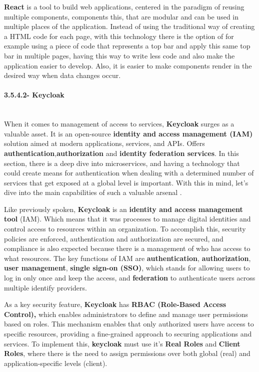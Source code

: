 \textbf{React} is a tool to build web applications, centered in the paradigm of reusing multiple components, components this, that are modular and can be used in multiple places of the application. Instead of using the traditional way of creating a HTML code for each page, with this technology there is the option of for example using a piece of code that represents a top bar and apply this same top bar in multiple pages, having this way to write less code and also make the application easier to develop. Also, it is easier to make components render in the desired way when data changes occur. 

\paragraph{3.5.4.2- Keycloak}\mbox{}\\
When it comes to management of access to services, \textbf{Keycloak} surges as a valuable asset. It is an open-source \textbf{identity and access management (IAM)} solution aimed at modern applications, services, and APIs. Offers \textbf{authentication},\textbf{authorization} and \textbf{identity federation services}. In this section, there is a deep dive into microservices, and having a technology that could create means for authentication when dealing with a determined number of services that get exposed at a global level is important. With this in mind, let's dive into the main capabilities of such a valuable arsenal \cite{keycloak}.

Like previously spoken, \textbf{Keycloak} is an \textbf{identity and access management tool} (IAM). Which means that it was processes to manage digital identities and control access to resources within an organization. To accomplish this, security policies are enforced, authentication and authorization are secured, and compliance is also expected because there is a management of who has access to what resources. The key functions of IAM are \textbf{authentication}, \textbf{authorization}, \textbf{user management}, \textbf{single sign-on (SSO)}, which stands for allowing users to log in only once and keep the access, and \textbf{federation} to authenticate users across multiple identify providers.

As a key security feature, \textbf{Keycloak} has \textbf{RBAC (Role-Based Access Control),} which enables administrators to define and manage user permissions based on roles. This mechanism enables that only authorized users have access to specific resources, providing a fine-grained approach to securing applications and services. To implement this, \textbf{keycloak} must use it's \textbf{Real Roles} and \textbf{Client Roles}, where there is the need to assign permissions over both global (real) and application-specific levels (client).

